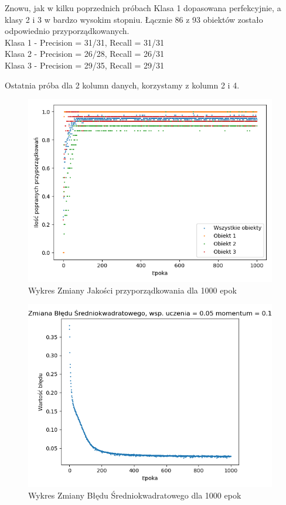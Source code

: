 \documentclass[12pt]{article}
\begin{document}
Znowu, jak w kilku poprzednich próbach Klasa 1 dopasowana perfekcyjnie, a klasy 2 i 3 w bardzo wysokim stopniu. Łącznie 86 z 93 obiektów zostało odpowiednio przyporządkowanych. 
\\Klasa 1 - Precision = 31/31, Recall = 31/31\\
Klasa 2 - Precision = 26/28, Recall = 26/31\\
Klasa 3 - Precision = 29/35, Recall = 29/31\\

\newpage

Ostatnia próba dla 2 kolumn danych, korzystamy z kolumn 2 i 4.

\begin{figure}[!ht]
 \centering
 \includegraphics[width=11cm]{WykresPrzyporzadkowania10neuron2wejscia5.png}
 \caption{Wykres Zmiany Jakości przyporządkowania dla 1000 epok}
 \vspace{-0.1cm}
 \label{WykresPrzyp15}
\end{figure}

\newpage

\begin{figure}[!ht]
 \centering
 \includegraphics[width=11cm]{WykresBlad10neuron2wejscia5.png}
 \caption{Wykres Zmiany Błędu Średniokwadratowego dla 1000 epok}
 \vspace{-0.1cm}
 \label{WykresBlad15}
\end{figure}
\end{document}
